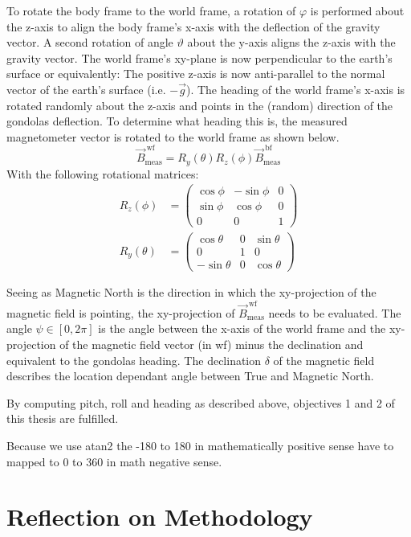 To rotate the body frame to the world frame, a rotation of $\varphi$ is performed about the z-axis to align the body frame's x-axis with the deflection of the gravity vector. A second rotation of angle $\vartheta$ about the y-axis aligns the z-axis with the gravity vector. The world frame's xy-plane is now perpendicular to the earth's surface or equivalently: The positive z-axis is now anti-parallel to the normal vector of the earth's surface (i.e. $-\vec{g}$). The heading of the world frame's x-axis is rotated randomly about the z-axis and points in the (random) direction of the gondolas deflection. To determine what heading this is, the measured magnetometer vector is rotated to the world frame as shown below.
\begin{equation}
    \vec{B}_{\mathrm{meas}}^{\ \mathrm{wf}}=R_y(\theta)R_z(\phi)\vec{B}_{\mathrm{meas}}^{\ \mathrm{bf}}
\end{equation}
With the following rotational matrices:
\begin{align}
    R_z(\phi)&=\begin{pmatrix}
                \cos\phi & -\sin\phi & 0 \\
                \sin\phi & \cos\phi & 0 \\
                0 & 0 & 1
                \end{pmatrix} \\
    R_y(\theta)&=\begin{pmatrix}
                \cos\theta & 0 & \sin\theta \\
                0 & 1 & 0 \\
                -\sin\theta & 0 & \cos\theta
                \end{pmatrix}
\end{align}

Seeing as Magnetic North is the direction in which the xy-projection of the magnetic field is pointing, the xy-projection of $\vec{B}_{\mathrm{meas}}^{\ \mathrm{wf}}$ needs to be evaluated. The angle $\psi\in[0,2\pi]$ is the angle between the x-axis of the world frame and the xy-projection of the magnetic field vector (in wf) minus the declination and equivalent to the gondolas heading. The declination $\delta$ of the magnetic field describes the location dependant angle between True and Magnetic North.

By computing pitch, roll and heading as described above, objectives 1 and 2 of this thesis are fulfilled.

Because we use atan2 the -180 to 180 in mathematically positive sense have to mapped to 0 to 360 in math negative sense. 

\section{Reflection on Methodology \label{sec:meth:reflection_methodology}}